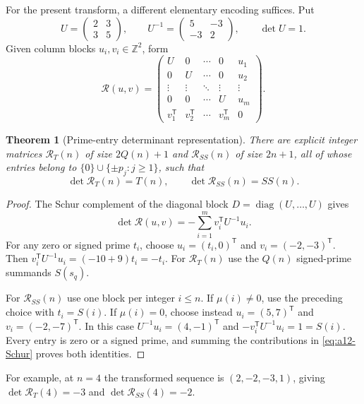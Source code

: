 \documentclass[11pt]{amsart}
\numberwithin{equation}{section}
\theoremstyle{plain}
\newtheorem{theorem}{Theorem}[section]
\theoremstyle{definition}
\theoremstyle{remark}
\begin{document}
For the present transform, a different elementary encoding suffices.
Put
\begin{equation}
\label{eq:a12-prime-block-matrix}
U=\begin{pmatrix}2&3\\3&5\end{pmatrix},\qquad
U^{-1}=\begin{pmatrix}5&-3\\-3&2\end{pmatrix},\qquad \det U=1.
\end{equation}
Given column blocks $u_i,v_i\in\mathbb Z^2$, form
\begin{equation}
\label{eq:a12-bordered-matrix}
\mathcal R(u,v)=
\begin{pmatrix}
U&0&\cdots&0&u_1\\
0&U&\cdots&0&u_2\\
\vdots&\vdots&\ddots&\vdots&\vdots\\
0&0&\cdots&U&u_m\\
v_1^\mathsf{T}&v_2^\mathsf{T}&\cdots&v_m^\mathsf{T}&0
\end{pmatrix}.
\end{equation}
\begin{theorem}[Prime-entry determinant representation]
\label{thm:a12-determinants}
There are explicit integer matrices $\mathcal R_T(n)$ of size
$2Q(n)+1$ and $\mathcal R_{SS}(n)$ of size $2n+1$, all of whose entries
belong to $\{0\}\cup\{\pm p_j:j\ge1\}$, such that
\begin{equation}
\label{eq:a12-det-identities}
\boxed{\det\mathcal R_T(n)=T(n),\qquad
\det\mathcal R_{SS}(n)=SS(n).}
\end{equation}
\end{theorem}
\begin{proof}
The Schur complement of the diagonal block
$D=\operatorname{diag}(U,\ldots,U)$ gives
\begin{equation}
\label{eq:a12-Schur}
\det\mathcal R(u,v)=-\sum_{i=1}^m v_i^\mathsf{T}U^{-1}u_i.
\end{equation}
For any zero or signed prime $t_i$, choose
$u_i=(t_i,0)^\mathsf{T}$ and $v_i=(-2,-3)^\mathsf{T}$.
Then
$v_i^\mathsf{T}U^{-1}u_i=(-10+9)t_i=-t_i$.
For $\mathcal R_T(n)$ use the $Q(n)$ signed-prime summands $S(s_q)$.

For $\mathcal R_{SS}(n)$ use one block per integer $i\le n$.
If $\mu(i)\ne0$, use the preceding choice with $t_i=S(i)$.
If $\mu(i)=0$, choose instead
$u_i=(5,7)^\mathsf{T}$ and $v_i=(-2,-7)^\mathsf{T}$.
In this case $U^{-1}u_i=(4,-1)^\mathsf{T}$ and
$-v_i^\mathsf{T}U^{-1}u_i=1=S(i)$.
Every entry is zero or a signed prime, and summing the contributions
in \eqref{eq:a12-Schur} proves both identities.
\end{proof}
For example, at $n=4$ the transformed sequence is $(2,-2,-3,1)$, giving
$\det\mathcal R_T(4)=-3$ and $\det\mathcal R_{SS}(4)=-2$.
\end{document}
